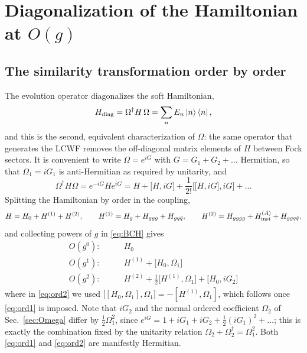\documentclass[11pt]{article}
\newcommand{\dg}{\dagger}
\newcommand{\ket}[1]{\left|#1\right\rangle}
\newcommand{\bra}[1]{\left\langle#1\right|}
\newcommand{\OM}{\Omega}
\begin{document}
\section{Diagonalization of the Hamiltonian at $O(g)$}
\label{sec:diagg}

\subsection{The similarity transformation order by order}

The evolution operator diagonalizes the soft Hamiltonian,
\begin{equation}
H_{\rm diag}=\OM^{\dg}H\,\OM=\sum_{n}E_{n}\ket{n}\bra{n},
\label{eq:Hdiag}
\end{equation}
and this is the second, equivalent characterization of $\OM$: the same operator that generates the
LCWF removes the off-diagonal matrix elements of $H$ between Fock sectors. It is convenient to
write $\OM=e^{iG}$ with $G=G_{1}+G_{2}+\dots$ Hermitian, so that
$\OM_{1}=iG_{1}$ is anti-Hermitian as required by unitarity, and
\begin{equation}
\OM^{\dg}H\OM=e^{-iG}He^{iG}
=H+\big[H,iG\big]+\frac{1}{2!}\Big[\big[H,iG\big],iG\Big]+\dots
\label{eq:BCH}
\end{equation}
Splitting the Hamiltonian by order in the coupling,
\begin{equation}
H=H_{0}+H^{(1)}+H^{(2)},\qquad
H^{(1)}=H_{g}+H_{ggg}+H_{gq\bar q},\qquad
H^{(2)}=H_{gggg}+H^{(A)}_{\rm inst}+H_{ggq\bar q},
\label{eq:Hsplit}
\end{equation}
and collecting powers of $g$ in \eqref{eq:BCH} gives
\begin{align}
O(g^{0}):&\qquad H_{0}
\label{eq:ord0}\\
O(g^{1}):&\qquad H^{(1)}+\big[H_{0},\OM_{1}\big]
\label{eq:ord1}\\
O(g^{2}):&\qquad H^{(2)}+\tfrac12\big[H^{(1)},\OM_{1}\big]+\big[H_{0},iG_{2}\big]
\label{eq:ord2}
\end{align}
where in \eqref{eq:ord2} we used $\big[[H_{0},\OM_{1}],\OM_{1}\big]=-[H^{(1)},\OM_{1}]$, which
follows once \eqref{eq:ord1} is imposed. Note that $iG_{2}$ and the normal ordered coefficient
$\OM_{2}$ of Sec.~\ref{sec:Omega} differ by $\tfrac12\OM_{1}^{2}$, since
$e^{iG}=1+iG_{1}+iG_{2}+\tfrac12(iG_{1})^{2}+\dots$; this is exactly the combination fixed by the
unitarity relation $\OM_{2}+\OM_{2}^{\dg}=\OM_{1}^{2}$. Both \eqref{eq:ord1} and \eqref{eq:ord2}
are manifestly Hermitian.
\end{document}
